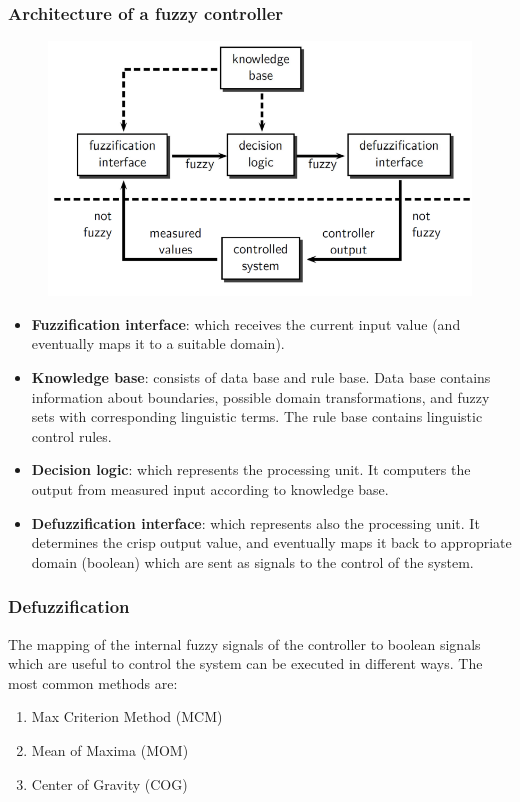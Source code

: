 \documentclass{article}
\begin{document}
\subsubsection{Architecture of a fuzzy controller}
\begin{figure}[h]
    \centering
    \includegraphics[scale=0.5]{images/fuzzy-controller.png}
\end{figure}
\begin{itemize}
    \item \textbf{Fuzzification interface}: which receives the current input value (and
          eventually maps it to a suitable domain).
    \item \textbf{Knowledge base}: consists of data base and rule base. Data base contains
          information about boundaries, possible domain transformations, and fuzzy sets with corresponding linguistic
          terms. The rule base contains linguistic control rules.
    \item \textbf{Decision logic}: which represents the processing unit. It computers the output
          from measured input according to knowledge base.
    \item \textbf{Defuzzification interface}: which represents also the processing unit. It determines
          the crisp output value, and eventually maps it back to appropriate domain (boolean) which are sent as
          signals to the control of the system.
\end{itemize}

\subsubsection{Defuzzification}
The mapping of the internal fuzzy signals of the controller to boolean signals which are useful
to control the system can be executed in different ways. The most common methods are:
\begin{enumerate}
    \item Max Criterion Method (MCM)
    \item Mean of Maxima (MOM)
    \item Center of Gravity (COG)
\end{enumerate}
\end{document}
